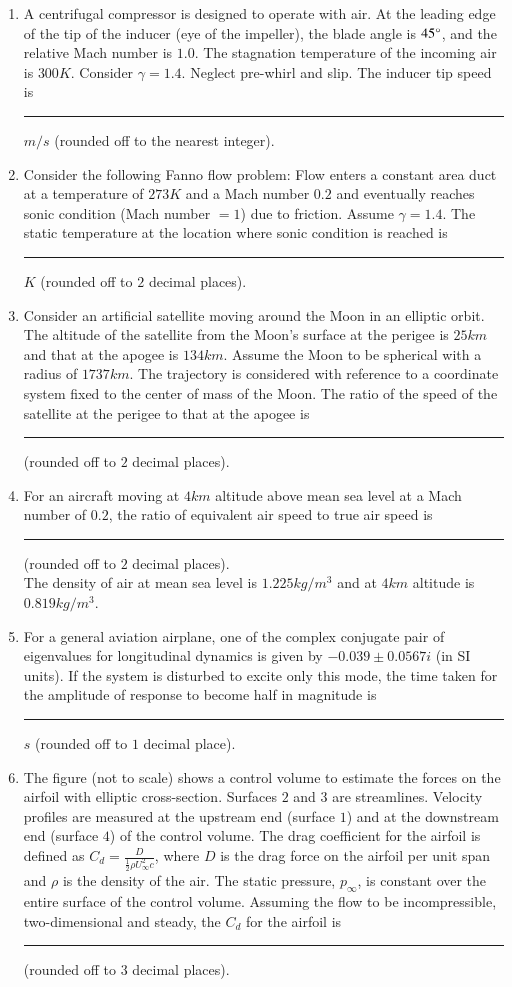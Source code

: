 \documentclass[journal]{IEEEtran}
\begin{document}
\begin{enumerate}
\item A centrifugal compressor is designed to operate with air. At the leading edge of the tip of the inducer (eye of the impeller), the blade angle is $45\degree$, and the relative Mach number is $1.0$. The stagnation temperature of the incoming air is $300K$. Consider $\gamma=1.4$. Neglect pre-whirl and slip. The inducer tip speed is \rule{1cm}{0.15mm} $m/s$ (rounded off to the nearest integer).


\item Consider the following Fanno flow problem: Flow enters a constant area duct at a temperature of $273K$ and a Mach number $0.2$ and eventually reaches sonic condition (Mach number $=1$) due to friction. Assume $\gamma=1.4$. The static temperature at the location where sonic condition is reached is \rule{1cm}{0.15mm} $K$ (rounded off to $2$ decimal places).


\item Consider an artificial satellite moving around the Moon in an elliptic orbit. The altitude of the satellite from the Moon's surface at the perigee is $25km$ and that at the apogee is $134km$. Assume the Moon to be spherical with a radius of $1737km$. The trajectory is considered with reference to a coordinate system fixed to the center of mass of the Moon. The ratio of the speed of the satellite at the perigee to that at the apogee is \rule{1cm}{0.15mm} (rounded off to $2$ decimal places).


\item For an aircraft moving at $4km$ altitude above mean sea level at a Mach number of $0.2$, the ratio of equivalent air speed to true air speed is \rule{1cm}{0.15mm} (rounded off to $2$ decimal places).\\

The density of air at mean sea level is $1.225kg/m^{3}$ and at $4km$ altitude is $0.819kg/m^{3}$.


\item For a general aviation airplane, one of the complex conjugate pair of eigenvalues for longitudinal dynamics is given by $-0.039\pm 0.0567i$ (in SI units). If the system is disturbed to excite only this mode, the time taken for the amplitude of response to become half in magnitude is \rule{1cm}{0.15mm} $s$ (rounded off to $1$ decimal place).


\item The figure (not to scale) shows a control volume to estimate the forces on the airfoil with elliptic cross-section. Surfaces $2$ and $3$ are streamlines. Velocity profiles are measured at the upstream end (surface $1$) and at the downstream end (surface $4$) of the control volume. The drag coefficient for the airfoil is defined as $C_{d}=\frac{D}{\frac{1}{2}\rho U_{\infty}^{2}c}$, where $D$ is the drag force on the airfoil per unit span and $\rho$ is the density of the air. The static pressure, $p_{\infty}$, is constant over the entire surface of the control volume. Assuming the flow to be incompressible, two-dimensional and steady, the $C_{d}$ for the airfoil is \rule{1cm}{0.15mm} (rounded off to $3$ decimal places).


\end{enumerate}
\end{document}
